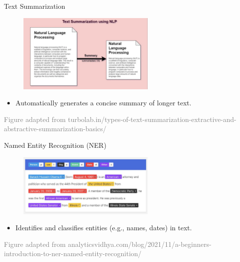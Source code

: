 \documentclass[serif, aspectratio=169]{beamer}
\begin{document}
\begin{frame}{Text Summarization}
	\begin{figure}
		\centering
		\includegraphics[width=0.6\textwidth]{pic/summarization_image.png}
	\end{figure}
	\begin{itemize}
		\item Automatically generates a concise summary of longer text.
	\end{itemize}
	\vspace{0.6cm}
	\hspace{-1.0cm}
	{\tiny \textcolor{gray}{Figure adapted from turbolab.in/types-of-text-summarization-extractive-and-abstractive-summarization-basics/}}
\end{frame}

\begin{frame}{Named Entity Recognition (NER)}
	\begin{figure}
		\centering
		\includegraphics[width=0.6\textwidth]{pic/ner_image.jpg}
	\end{figure}
	\begin{itemize}
		\item Identifies and classifies entities (e.g., names, dates) in text.
	\end{itemize}
	\vspace{1.6cm}
	\hspace{-1.0cm}
	{\tiny \textcolor{gray}{Figure adapted from analyticsvidhya.com/blog/2021/11/a-beginners-introduction-to-ner-named-entity-recognition/}}
\end{frame}
\end{document}
